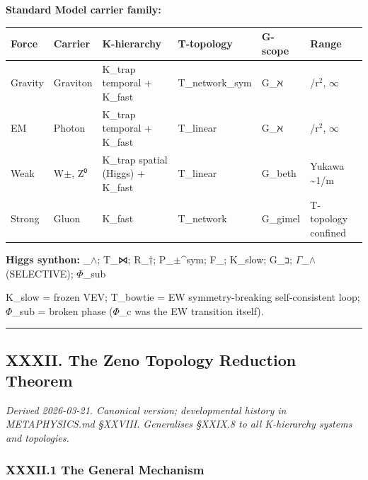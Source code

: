 \documentclass[12pt,a4paper]{article}
\begin{document}
\textbf{Standard Model carrier family:}

\begin{table}[htbp]
\centering
\small
{}
\begin{tabularx}{\textwidth}{>{\centering\arraybackslash}X >{\centering\arraybackslash}X >{\centering\arraybackslash}X >{\centering\arraybackslash}X >{\centering\arraybackslash}X >{\centering\arraybackslash}X}
\toprule
\rowcolor{gray!25}\textbf{Force} & \textbf{Carrier} & \textbf{K-hierarchy} & \textbf{T-topology} & \textbf{G-scope} & \textbf{Range} \\
\midrule
\rowcolors{1}{white}{gray!10}
Gravity & Graviton & K\_trap temporal + K\_fast & T\_network\_sym & G\_ℵ & 1/r$^{2}$, $\infty$ \\
EM & Photon & K\_trap temporal + K\_fast & T\_linear & G\_ℵ & 1/r$^{2}$, $\infty$ \\
Weak & W$\pm$, Z⁰ & K\_trap spatial (Higgs) + K\_fast & T\_linear & G\_beth & Yukawa \textasciitilde{}1/m \\
Strong & Gluon & K\_fast & T\_network & G\_gimel & T-topology confined \\
\bottomrule
\end{tabularx}
\end{table}

\textbf{Higgs synthon:} \langleD\_$\land$; T\_⋈; R\_†; P\_$\pm$\^{}sym; F\_\hbar; K\_slow; G\_ב; $\Gamma$\_$\land$(SELECTIVE); $\Phi$\_sub\rangle

K\_slow = frozen VEV; T\_bowtie = EW symmetry-breaking self-consistent loop; $\Phi$\_sub = broken phase ($\Phi$\_c was the EW transition itself).

\begin{center}
\rule{0.5\textwidth}{0.4pt}
\end{center}

\subsection{XXXII. The Zeno Topology Reduction Theorem}

\emph{Derived 2026-03-21. Canonical version; developmental history in METAPHYSICS.md §XXVIII. Generalises §XXIX.8 to all K-hierarchy systems and topologies.}

\subsubsection{XXXII.1 The General Mechanism}
\end{document}
